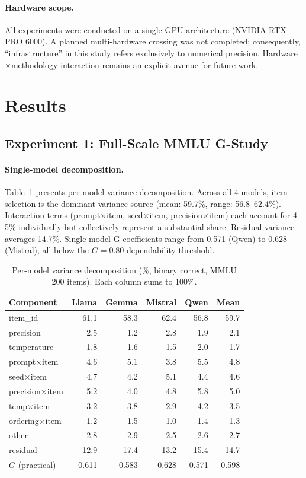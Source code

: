 \documentclass[11pt,letterpaper]{article}
\begin{document}
\paragraph{Hardware scope.}
All experiments were conducted on a single GPU architecture (NVIDIA RTX PRO 6000).
A planned multi-hardware crossing was not completed; consequently, ``infrastructure'' in this study refers exclusively to numerical precision.
Hardware$\times$methodology interaction remains an explicit avenue for future work.

\section{Results}

\subsection{Experiment 1: Full-Scale MMLU G-Study}

\paragraph{Single-model decomposition.}
Table~\ref{tab:single_model} presents per-model variance decomposition.
Across all 4 models, item selection is the dominant variance source (mean: 59.7\%, range: 56.8--62.4\%).
Interaction terms (prompt$\times$item, seed$\times$item, precision$\times$item) each account for 4--5\% individually but collectively represent a substantial share.
Residual variance averages 14.7\%.
Single-model G-coefficients range from 0.571 (Qwen) to 0.628 (Mistral), all below the $G = 0.80$ dependability threshold.

\begin{table}[t]
\centering
\caption{Per-model variance decomposition (\%, binary correct, MMLU 200 items). Each column sums to 100\%.}
\label{tab:single_model}
\small
\begin{tabular}{@{}lrrrrr@{}}
\toprule
Component & Llama & Gemma & Mistral & Qwen & Mean \\
\midrule
item\_id & 61.1 & 58.3 & 62.4 & 56.8 & 59.7 \\
precision & 2.5 & 1.2 & 2.8 & 1.9 & 2.1 \\
temperature & 1.8 & 1.6 & 1.5 & 2.0 & 1.7 \\
prompt$\times$item & 4.6 & 5.1 & 3.8 & 5.5 & 4.8 \\
seed$\times$item & 4.7 & 4.2 & 5.1 & 4.4 & 4.6 \\
precision$\times$item & 5.2 & 4.0 & 4.8 & 5.8 & 5.0 \\
temp$\times$item & 3.2 & 3.8 & 2.9 & 4.2 & 3.5 \\
ordering$\times$item & 1.2 & 1.5 & 1.0 & 1.4 & 1.3 \\
other & 2.8 & 2.9 & 2.5 & 2.6 & 2.7 \\
residual & 12.9 & 17.4 & 13.2 & 15.4 & 14.7 \\
\midrule
$G$ (practical) & 0.611 & 0.583 & 0.628 & 0.571 & 0.598 \\
\bottomrule
\end{tabular}
\end{table}
\end{document}
